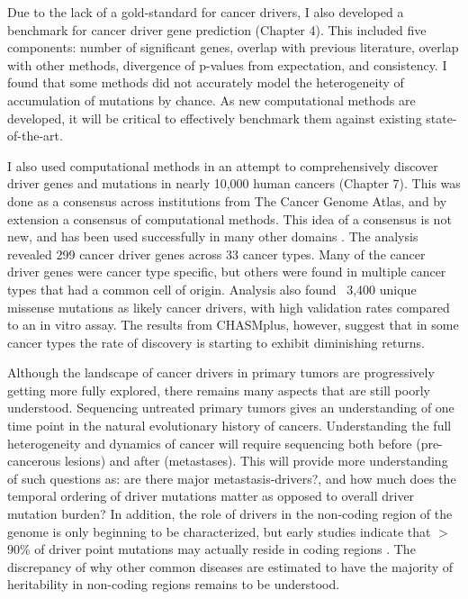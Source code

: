 Due to the lack of a gold-standard for cancer drivers, I also developed a benchmark for cancer driver gene prediction (Chapter 4). This included five components: number of significant genes, overlap with previous literature, overlap with other methods, divergence of p-values from expectation, and consistency. I found that some methods did not accurately model the heterogeneity of accumulation of mutations by chance. As new computational methods are developed, it will be critical to effectively benchmark them against existing state-of-the-art.

I also used computational methods in an attempt to comprehensively discover driver genes and mutations in nearly 10,000 human cancers (Chapter 7). This was done as a consensus across institutions from The Cancer Genome Atlas, and by extension a consensus of computational methods. This idea of a consensus is not new, and has been used successfully in many other domains \cite{RN190, RN189}. The analysis revealed 299 cancer driver genes across 33 cancer types. Many of the cancer driver genes were cancer type specific, but others were found in multiple cancer types that had a common cell of origin. Analysis also found ~3,400 unique missense mutations as likely cancer drivers, with high validation rates compared to an in vitro assay. The results from CHASMplus, however, suggest that in some cancer types the rate of discovery is starting to exhibit diminishing returns.

Although the landscape of cancer drivers in primary tumors are progressively getting more fully explored, there remains many aspects that are still poorly understood. Sequencing untreated primary tumors gives an understanding of one time point in the natural evolutionary history of cancers. Understanding the full heterogeneity and dynamics of cancer will require sequencing both before (pre-cancerous lesions) and after (metastases). This will provide more understanding of such questions as: are there major metastasis-drivers?, and how much does the temporal ordering of driver mutations matter as opposed to overall driver mutation burden? In addition, the role of drivers in the non-coding region of the genome is only beginning to be characterized, but early studies indicate that $>$90\% of driver point mutations may actually reside in coding regions \cite{RN17}. The discrepancy of why other common diseases are estimated to have the majority of heritability in non-coding regions \cite{RN192, RN193} remains to be understood.

